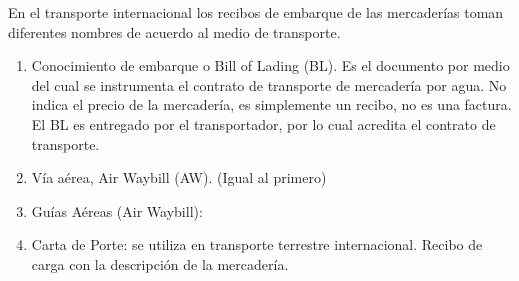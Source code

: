 En el transporte internacional los recibos de embarque de las mercaderías toman 
diferentes nombres de acuerdo al medio de transporte.
\begin{enumerate}
      \item Conocimiento de embarque o Bill of Lading (BL). Es el documento por 
      medio del cual se instrumenta el contrato de transporte de mercadería 
      por agua. No indica el precio de la mercadería, es simplemente un recibo,
      no es una factura. El BL es entregado por el transportador, por lo cual 
      acredita el contrato de transporte.
      \item Vía aérea, Air Waybill (AW). (Igual al primero)
      \item  Guías Aéreas (Air Waybill): 
      \item Carta de Porte: 
      se utiliza en transporte terrestre internacional. 
      Recibo de carga con la descripción de la mercadería.
\end{enumerate}